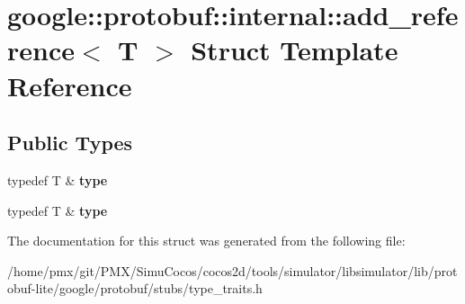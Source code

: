 \hypertarget{structgoogle_1_1protobuf_1_1internal_1_1add__reference}{}\section{google\+:\+:protobuf\+:\+:internal\+:\+:add\+\_\+reference$<$ T $>$ Struct Template Reference}
\label{structgoogle_1_1protobuf_1_1internal_1_1add__reference}
\subsection*{Public Types}
\begin{DoxyCompactItemize}
\item 
\mbox{\label{structgoogle_1_1protobuf_1_1internal_1_1add__reference_a967059a0ccb693807a69a7bde7a98694}} 
typedef T \& {\bfseries type}
\item 
\mbox{\label{structgoogle_1_1protobuf_1_1internal_1_1add__reference_a967059a0ccb693807a69a7bde7a98694}} 
typedef T \& {\bfseries type}
\end{DoxyCompactItemize}


The documentation for this struct was generated from the following file\+:\begin{DoxyCompactItemize}
\item 
/home/pmx/git/\+P\+M\+X/\+Simu\+Cocos/cocos2d/tools/simulator/libsimulator/lib/protobuf-\/lite/google/protobuf/stubs/type\+\_\+traits.\+h\end{DoxyCompactItemize}

